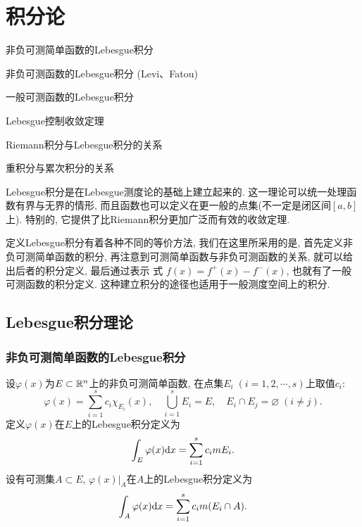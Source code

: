 \chapter{积分论}

\begin{introduction}
	\item 非负可测简单函数的Lebesgue积分
	\item 非负可测函数的Lebesgue积分 (Levi、Fatou)
	\item 一般可测函数的Lebesgue积分
	\item Lebesgue控制收敛定理
	\item Riemann积分与Lebesgue积分的关系
	\item 重积分与累次积分的关系
\end{introduction}

Lebesgue积分是在Lebesgue测度论的基础上建立起来的. 
这一理论可以统一处理函数有界与无界的情形, 
而且函数也可以定义在更一般的点集(不一定是闭区间$[a,b]$上). 
特别的, 它提供了比Riemann积分更加广泛而有效的收敛定理. 

定义Lebesgue积分有着各种不同的等价方法, 
我们在这里所采用的是, 首先定义非负可测简单函数的积分, 
再注意到可测简单函数与非负可测函数的关系, 就可以给出后者的积分定义, 
最后通过表示 式 $f(x)=f^{+}(x)-f^{-}(x)$, 也就有了一般可测函数的积分定义. 
这种建立积分的途径也适用于一般测度空间上的积分.

\section{Lebesgue积分理论}
\subsection{非负可测简单函数的Lebesgue积分}

\begin{definition}[非负可测简单函数的积分]
	设$\varphi(x)$为$E \subset \mathbb{R}^n$上的非负可测简单函数, 在点集$E_i \; (i = 1,2,\cdots,s)$上取值$c_i$:
	$$
		\varphi(x) = \sum\limits_{i=1}^s c_i \chi_{E_i} (x) , \quad 
		\bigcup\limits_{i=1}^s E_i = E , \quad
		E_i \cap E_j = \varnothing \; (i \neq j). 
	$$
	定义$\varphi(x)$在$E$上的Lebesgue积分定义为
	\begin{equation}
		\int_E \varphi(x) \mathrm{d} x = \sum\limits_{i=1}^s c_i m E_i. 
	\end{equation}
	设有可测集$A \subset E$, $\varphi(x)|_A$在$A$上的Lebesgue积分定义为
	\begin{equation}
		\int_A \varphi(x) \mathrm{d} x = \sum\limits_{i=1}^s c_i m (E_i \cap A).
	\end{equation}
\end{definition}

